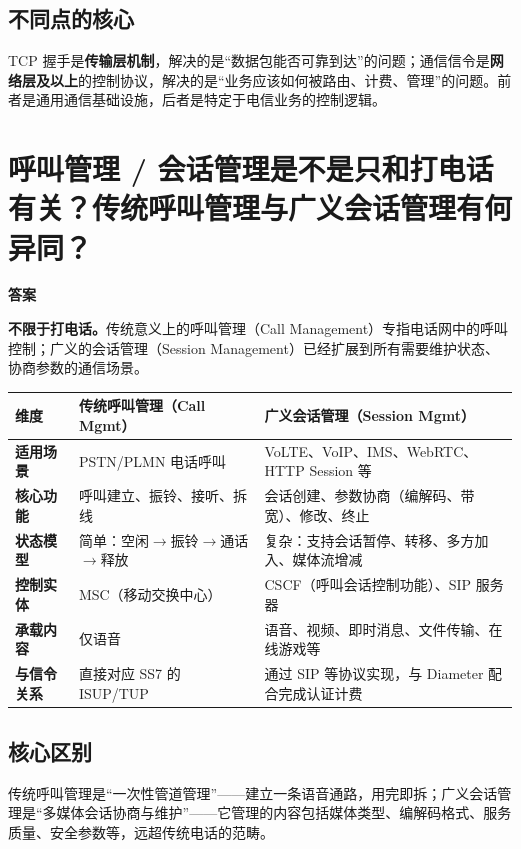 \documentclass[12pt,a4paper]{ctexart}
\begin{document}
\subsection*{不同点的核心}
TCP 握手是\textbf{传输层机制}，解决的是“数据包能否可靠到达”的问题；通信信令是\textbf{网络层及以上}的控制协议，解决的是“业务应该如何被路由、计费、管理”的问题。前者是通用通信基础设施，后者是特定于电信业务的控制逻辑。

\section{呼叫管理 / 会话管理是不是只和打电话有关？传统呼叫管理与广义会话管理有何异同？}

\textbf{答案}

\textbf{不限于打电话。}传统意义上的呼叫管理（Call Management）专指电话网中的呼叫控制；广义的会话管理（Session Management）已经扩展到所有需要维护状态、协商参数的通信场景。

\begin{table}[htbp]
\centering
\scriptsize
\begin{tabular}{>{\bfseries}p{3cm} p{5.2cm} p{5.8cm}}
\toprule
\textbf{维度} & \textbf{传统呼叫管理（Call Mgmt）} & \textbf{广义会话管理（Session Mgmt）} \\
\midrule
适用场景 &
PSTN/PLMN 电话呼叫 &
VoLTE、VoIP、IMS、WebRTC、HTTP Session 等 \\
\addlinespace
核心功能 &
呼叫建立、振铃、接听、拆线 &
会话创建、参数协商（编解码、带宽）、修改、终止 \\
\addlinespace
状态模型 &
简单：空闲$\rightarrow$振铃$\rightarrow$通话$\rightarrow$释放 &
复杂：支持会话暂停、转移、多方加入、媒体流增减 \\
\addlinespace
控制实体 &
MSC（移动交换中心） &
CSCF（呼叫会话控制功能）、SIP 服务器 \\
\addlinespace
承载内容 &
仅语音 &
语音、视频、即时消息、文件传输、在线游戏等 \\
\addlinespace
与信令关系 &
直接对应 SS7 的 ISUP/TUP &
通过 SIP 等协议实现，与 Diameter 配合完成认证计费 \\
\bottomrule
\end{tabular}
\end{table}

\subsection*{核心区别}
传统呼叫管理是“一次性管道管理”——建立一条语音通路，用完即拆；广义会话管理是“多媒体会话协商与维护”——它管理的内容包括媒体类型、编解码格式、服务质量、安全参数等，远超传统电话的范畴。
\end{document}

